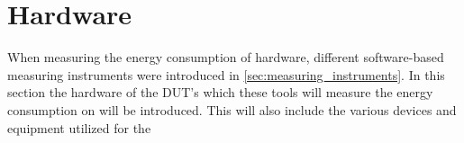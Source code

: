 \section{Hardware}\label{sec:hardware}


When measuring the energy consumption of hardware, different software-based measuring instruments were introduced in \cref{sec:measuring_instruments}. In this section the hardware of the DUT's which these tools will measure the energy consumption on will be introduced. This will also include the various devices and equipment utilized for the 




